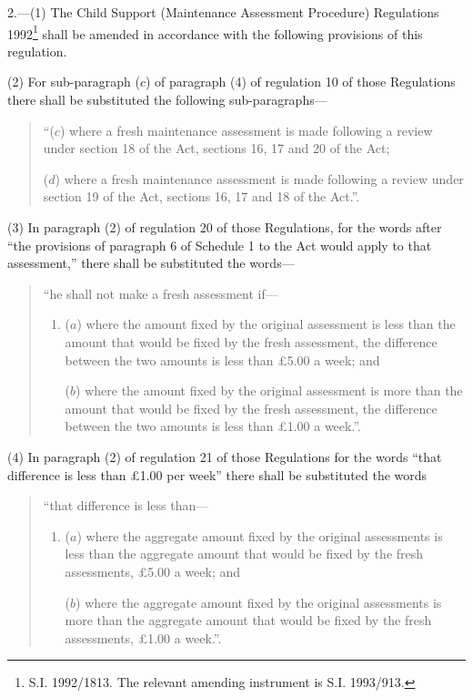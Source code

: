 \documentclass[a4paper]{article}
\begin{document}
2.—(1) The Child Support (Maintenance Assessment Procedure) Regulations 1992\footnote{\frenchspacing S.I. 1992/1813. The relevant amending instrument is S.I. 1993/913.} shall be amended in accordance with the following provisions of this regulation.

(2) For sub-paragraph ($c$) of paragraph (4) of regulation 10 of those Regulations there shall be substituted the following sub-paragraphs—
\begin{quotation}
“($c$) where a fresh maintenance assessment is made following a review under section 18 of the Act, sections 16, 17 and 20 of the Act;

($d$) where a fresh maintenance assessment is made following a review under section 19 of the Act, sections 16, 17 and 18 of the Act.”.
\end{quotation}

(3) In paragraph (2) of regulation 20 of those Regulations, for the words after “the provisions of paragraph 6 of Schedule 1 to the Act would apply to that assessment,” there shall be substituted the words—
\begin{quotation}
“he shall not make a fresh assessment if—
\begin{enumerate}\item[]
($a$) where the amount fixed by the original assessment is less than the amount that would be fixed by the fresh assessment, the difference between the two amounts is less than £5.00 a week; and

($b$) where the amount fixed by the original assessment is more than the amount that would be fixed by the fresh assessment, the difference between the two amounts is less than £1.00 a week.”.
\end{enumerate}
\end{quotation}

(4) In paragraph (2) of regulation 21 of those Regulations for the words “that difference is less than £1.00 per week” there shall be substituted the words
\begin{quotation}
“that difference is less than—
\begin{enumerate}\item[]
($a$) where the aggregate amount fixed by the original assessments is less than the aggregate amount that would be fixed by the fresh assessments, £5.00 a week; and

($b$) where the aggregate amount fixed by the original assessments is more than the aggregate amount that would be fixed by the fresh assessments, £1.00 a week.”.
\end{enumerate}
\end{quotation}
\end{document}

